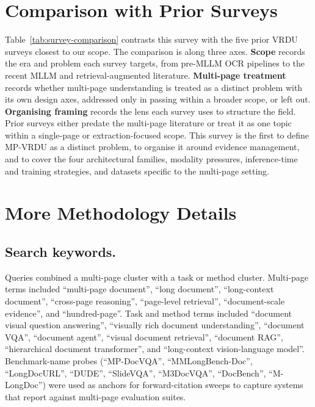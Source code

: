 \documentclass[11pt]{article}
\begin{document}
\clearpage 

\newpage
\appendix





\section{Comparison with Prior Surveys}
\label{app:survey-comparison}
Table~\ref{tab:survey-comparison} contrasts this survey with the five prior VRDU surveys closest to our scope. The comparison is along three axes. \textbf{Scope} records the era and problem each survey targets, from pre-MLLM OCR pipelines to the recent MLLM and retrieval-augmented literature. \textbf{Multi-page treatment} records whether multi-page understanding is treated as a distinct problem with its own design axes, addressed only in passing within a broader scope, or left out. \textbf{Organising framing} records the lens each survey uses to structure the field. Prior surveys either predate the multi-page literature or treat it as one topic within a single-page or extraction-focused scope. This survey is the first to define MP-VRDU as a distinct problem, to organise it around evidence management, and to cover the four architectural families, modality pressures, inference-time and training strategies, and datasets specific to the multi-page setting.



\section{More Methodology Details}
\label{app:methodology}

\subsection{Search keywords.}
Queries combined a multi-page cluster with a task or method cluster. Multi-page terms included ``multi-page document'', ``long document'', ``long-context document'', ``cross-page reasoning'', ``page-level retrieval'', ``document-scale evidence'', and ``hundred-page''. Task and method terms included ``document visual question answering'', ``visually rich document understanding'', ``document VQA'', ``document agent'', ``visual document retrieval'', ``document RAG'', ``hierarchical document transformer'', and ``long-context vision-language model''. Benchmark-name probes (``MP-DocVQA'', ``MMLongBench-Doc'', ``LongDocURL'', ``DUDE'', ``SlideVQA'', ``M3DocVQA'', ``DocBench'', ``M-LongDoc'') were used as anchors for forward-citation sweeps to capture systems that report against multi-page evaluation suites.
\end{document}
